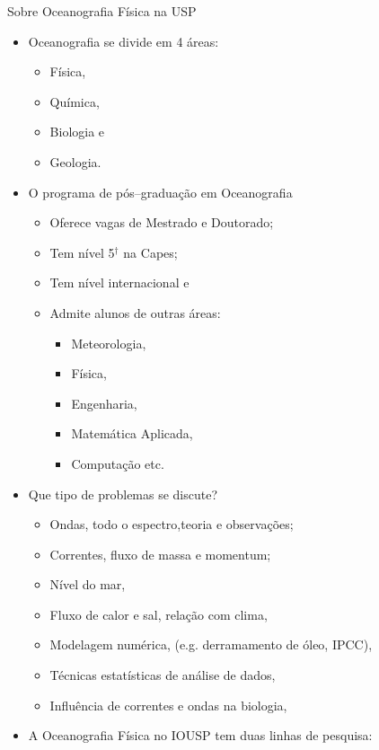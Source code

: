\documentclass{beamer}
\begin{document}
\begin{frame}[allowframebreaks]{\normalsize Sobre Oceanografia Física na USP}
  \begin{itemize}\setlength{\itemsep}{2ex}
  \item Oceanografia se divide em 4 áreas:
    \begin{itemize}
    \item \alert{Física,}
    \item Química,
    \item Biologia e
    \item Geologia.
    \end{itemize}
  \item O programa de pós--graduação em Oceanografia
    \begin{itemize}
    \item Oferece vagas de Mestrado e Doutorado;
    \item Tem nível 5$^\dagger$ na Capes;
    \item Tem nível internacional e
    \item Admite alunos de outras áreas:
      \begin{itemize}
      \item Meteorologia,
      \item Física,
      \item Engenharia,
      \item Matemática Aplicada,
      \item Computação etc.
      \end{itemize} 
    \end{itemize}
  \item Que tipo de problemas se discute?
    \begin{itemize}\setlength{\itemsep}{1.5ex}
    \item Ondas, todo o espectro,teoria e observações;
    \item Correntes, fluxo de massa e momentum;
    \item Nível do mar, 
    \item Fluxo de calor e sal, relação com clima,
    \item Modelagem numérica, (e.g. derramamento de óleo, IPCC), 
    \item Técnicas estatísticas de análise de dados,
    \item Influência de correntes e ondas na biologia,
    \end{itemize}
  \item A Oceanografia Física no IOUSP tem duas linhas de pesquisa:

\end{itemize}
\end{frame}
\end{document}
